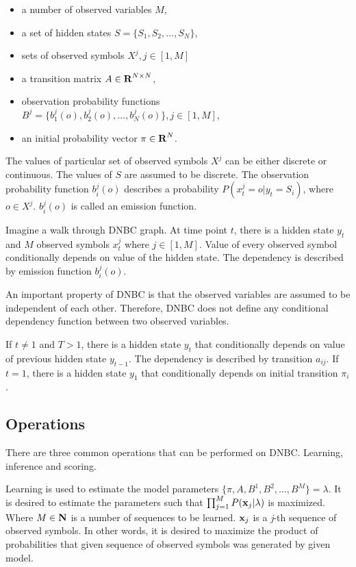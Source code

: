 \documentclass[thesis=B,english]{FITthesis}[2012/06/26]
\begin{document}
\begin{itemize}

\item{a number of observed variables $M$,}
\item a set of hidden states $S = \{S_1, S_2, \dots, S_N\}$,
\item{sets of observed symbols $X^j, j \in [1,M]$}
\item a transition matrix $A \in \textbf R^{N \times N}$,
\item observation probability functions $B^j = \{b_1^j(o), b_2^j(o), \dots, b_N^j(o)\}, j \in [1,M]$,
\item an initial probability vector $\pi \in \textbf R^N$.

\end{itemize}

The values of particular set of observed symbols $X^j$ can be either discrete or continuous. The values of $S$ are assumed to be discrete. The observation probability function $b_i^j(o)$ describes a probability $P(x^j_t=o|y_t=S_i)$, where $o \in X^j$. $b_i^j(o)$ is called an emission function.

Imagine a walk through DNBC graph. At time point $t$, there is a hidden state $y_t$ and $M$ observed symbols $x^j_t$ where $j \in [1,M]$. Value of every observed symbol conditionally depends on value of the hidden state. The dependency is described by emission function $b_i^j(o)$.

An important property of DNBC is that the observed variables are assumed to be independent of each other. Therefore, DNBC does not define any conditional dependency function between two observed variables.

If $t \neq 1$ and $T > 1$, there is a hidden state $y_t$ that conditionally depends on value of previous hidden state $y_{t-1}$. The dependency is described by transition $a_{ij}$. If $t = 1$, there is a hidden state $y_1$ that conditionally depends on initial transition $\pi_i$.

\subsection{Operations}

There are three common operations that can be performed on DNBC. Learning, inference and scoring.

Learning is used to estimate the model parameters $\{\pi,A,B^1,B^2,\dots,B^M\} = \lambda$. It is desired to estimate the parameters such that $\prod_{j=1}^{M} P(\textbf x_j | \lambda )$ is maximized. Where $M \in \textbf N$ is a number of sequences to be learned. $\textbf x_j$ is a \emph{j}-th sequence of observed symbols. In other words, it is desired to maximize the product of probabilities that given sequence of observed symbols was generated by given model.
\end{document}
